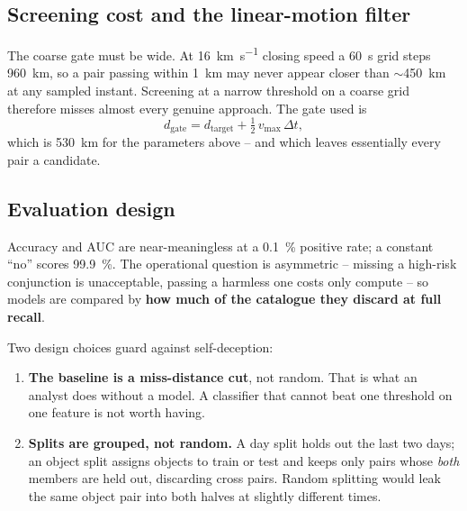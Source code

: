 \subsection{Screening cost and the linear-motion filter}

The coarse gate must be wide. At \SI{16}{\kilo\meter\per\second} closing
speed a \SI{60}{\second} grid steps \SI{960}{\kilo\meter}, so a pair passing
within \SI{1}{\kilo\meter} may never appear closer than
$\sim$\SI{450}{\kilo\meter} at any sampled instant. Screening at a narrow
threshold on a coarse grid therefore misses almost every genuine approach.
The gate used is
\begin{equation}
  d_{\text{gate}} = d_{\text{target}}
    + \tfrac{1}{2}\, v_{\max}\, \Delta t,
  \label{eq:gate}
\end{equation}
which is \SI{530}{\kilo\meter} for the parameters above -- and which leaves
essentially every pair a candidate.


\subsection{Evaluation design}

Accuracy and AUC are near-meaningless at a \SI{0.1}{\percent} positive rate;
a constant ``no'' scores \SI{99.9}{\percent}. The operational question is
asymmetric -- missing a high-risk conjunction is unacceptable, passing a
harmless one costs only compute -- so models are compared by \textbf{how
much of the catalogue they discard at full recall}.

Two design choices guard against self-deception:
\begin{enumerate}
  \item \textbf{The baseline is a miss-distance cut}, not random. That is
        what an analyst does without a model. A classifier that cannot beat
        one threshold on one feature is not worth having.
  \item \textbf{Splits are grouped, not random.} A day split holds out the
        last two days; an object split assigns objects to train or test and
        keeps only pairs whose \emph{both} members are held out, discarding
        cross pairs. Random splitting would leak the same object pair into
        both halves at slightly different times.
\end{enumerate}

